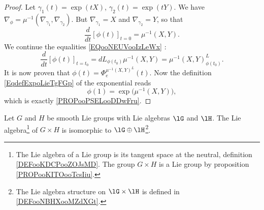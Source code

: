 \begin{proof}
	Let \( \gamma_1(t)=\exp(tX)\), \( \gamma_2(t)=\exp(tY)\). We have \( \nabla_{\phi}=\mu^{-1}(\nabla_{\gamma_1},\nabla_{\gamma_2})\). But \( \nabla_{\gamma_1}=X\) and \( \nabla_{\gamma_2}=Y\), so that
	\begin{equation}
		\frac{d}{dt} \left[ \phi(t)  \right]_{t=0}=\mu^{-1}(X,Y).
	\end{equation}
	We continue the equalities \eqref{EQooNEUVooIzLeWx} :
	\begin{equation}
		\frac{d}{dt} \left[ \phi(t)  \right]_{t=t_0}=dL_{\phi(t_0)}\mu^{-1}(X,Y)=\mu^{-1}(X,Y)^{L}_{\phi(t_0)}.
	\end{equation}
	It is now proven that \( \phi(t)=\Phi_e^{\mu^{-1}(X,Y)^L}(t)\). Now the definition \eqref{EqdefExpoLieTgFGp} of the exponential reads
	\begin{equation}
		\phi(1)=\exp\big( \mu^{-1}(X,Y) \big),
	\end{equation}
	which is exactly \eqref{PROPooPSELooDDwFru}.
\end{proof}

\begin{proposition}	  \label{PROPooFWGKooFgUZMZ}
	Let \( G\) and \( H \) be smooth Lie groups with Lie algebras \( \lG\) and \( \lH\). The Lie algebra\footnote{The Lie algebra of a Lie group is its tangent space at the neutral, definition \ref{DEFooKDCPooZOJsMD}. The group \( G\times H\) is a Lie group by proposition \ref{PROPooKITOooTcsIiu}.} of \( G\times H\) is isomorphic to \( \lG\oplus\lH\)\footnote{The Lie algebra structure on \( \lG\times \lH\) is defined in \ref{DEFooNBHXooMZdXGt}.}.
\end{proposition}

